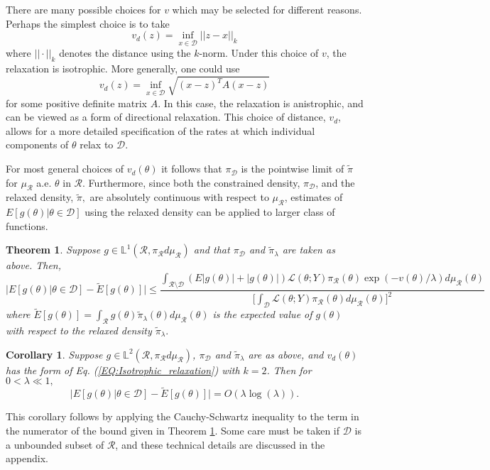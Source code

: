 \documentclass[10pt,fleqn]{article}
\newcommand{\leo}[1]{{\color{blue}{Leo: #1}}}
\newtheorem{theorem}{Theorem}
\newtheorem{corollary}{Corollary}
\DeclareMathOperator{\1}{\mathbbm{1}}
\begin{document}
{There are many possible choices for $v$ which may be selected for different reasons.  Perhaps the simplest choice is to take
\begin{equation}
\label{EQ:Isotrophic_relaxation}
v_d(z) =  \inf_{x\in\mathcal{D}} ||z-x||_k
\end{equation}
where $||\cdot||_k$ denotes the distance using the $k$-norm. Under this choice of $v$, the relaxation is isotrophic. More generally, one could use
\begin{equation}
v_d(z) = \inf_{x\in\mathcal{D}} \sqrt{(x-z)^T A (x-z)}\label{EQ:anistrophic_relaxation}
\end{equation} for some positive definite matrix $A$. In this case, the relaxation is anistrophic, and can be viewed as a form of directional relaxation. This choice of distance, $v_d$, allows for a more detailed specification of the rates at which individual components of $\theta$ relax to $\mathcal{D}$.  

For most general choices of $v_d(\theta)$ it follows that $\pi_\mathcal{D}$ is the pointwise limit of $\tilde{\pi}$ for $\mu_\mathcal{R}$ a.e. $\theta$ in $\mathcal{R}.$  Furthermore, since both the constrained density, $\pi_\mathcal{D}$, and the relaxed density, $\tilde{\pi},$ are absolutely continuous with respect to $\mu_\mathcal{R}$, estimates of $E[g(\theta)|\theta\in\mathcal{D}]$ using the relaxed density can be applied to larger class of functions.

\begin{theorem}
\label{THM:positive_measure_approximation_error}
Suppose $g \in \mathbb{L}^1(\mathcal{R}, \pi_\mathcal{R}d\mu_\mathcal{R})$ and that $\pi_\mathcal{D}$ and $\tilde{\pi}_\lambda$ are taken as above.  Then,
$$\bigg|E[g(\theta) |\theta\in\mathcal{D}] - \tilde{E}[g(\theta)]   \bigg| \le \frac{\int_{\mathcal{R}\setminus \mathcal{D}} (E|g(\theta)|+|g(\theta)|) \mathcal{L}(\theta; Y) \pi_\mathcal{R}(\theta)\exp(-v(\theta)/\lambda ) d\mu_\mathcal{R}(\theta)}{\big[\int_\mathcal{D} \mathcal{L}(\theta; Y) \pi_\mathcal{R}(\theta)d\mu_\mathcal{R}(\theta)\big]^2 }$$
where $\tilde{E}[g(\theta)] = \int_\mathcal{R} g(\theta) \tilde{\pi}_\lambda(\theta)d\mu_\mathcal{R}(\theta)$ is the expected value of $g(\theta)$ with respect to the relaxed density $\tilde{\pi}_\lambda.$
\end{theorem}

\begin{corollary}
Suppose $g \in  \mathbb{L}^2(\mathcal{R}, \pi_\mathcal{R}d\mu_\mathcal{R})$,  $\pi_\mathcal{D}$ and $\tilde{\pi}_\lambda$ are as above, and $v_d(\theta)$ has the form of Eq. (\ref{EQ:Isotrophic_relaxation}) with $k=2$.  Then for $0<\lambda \ll 1,$
$$ \bigg|E[g(\theta) |\theta\in\mathcal{D}] - \tilde{E}[g(\theta)]   \bigg| = O(\lambda\log(\lambda)).  $$ \leo{$\log(\lambda)<0?$}
\end{corollary}
This corollary follows by applying the Cauchy-Schwartz inequality to the term in the numerator of the bound given in Theorem \ref{THM:positive_measure_approximation_error}.  Some care must be taken if $\mathcal{D}$ is a unbounded subset of $\mathcal{R}$, and these technical details are discussed in the appendix.

}
\end{document}
